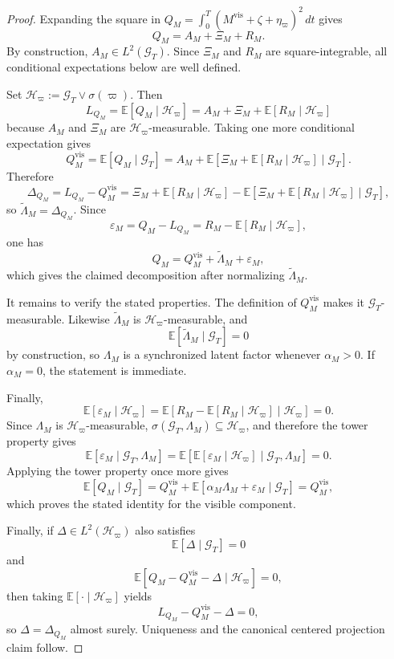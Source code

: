 \documentclass[11pt,a4paper]{amsart}
\theoremstyle{plain}
\theoremstyle{definition}
\theoremstyle{remark}
\newcommand{\EE}{\mathbb{E}}
\newcommand{\dd}{\,d}
\newcommand{\cH}{\mathcal{H}}
\newcommand{\cG}{\mathcal{G}}
\begin{document}
\begin{proof}
Expanding the square in \(Q_M=\int_0^T (M^{\mathrm{vis}}+\zeta+\eta_\varpi)^2\dd t\) gives
\[
        Q_M=A_M+\Xi_M+R_M.
\]
By construction, \(A_M\in L^2(\cG_T)\).  Since \(\Xi_M\) and \(R_M\) are square-integrable, all
conditional expectations below are well defined.

Set \(\cH_\varpi:=\cG_T\vee\sigma(\varpi)\).  Then
\[
        L_{Q_M}
        =
        \EE[Q_M\mid \cH_\varpi]
        =
        A_M+\Xi_M+\EE[R_M\mid \cH_\varpi]
\]
because \(A_M\) and \(\Xi_M\) are \(\cH_\varpi\)-measurable.  Taking one more conditional
expectation gives
\[
        Q_M^{\mathrm{vis}}
        =
        \EE[Q_M\mid \cG_T]
        =
        A_M+\EE[\Xi_M+\EE[R_M\mid \cH_\varpi]\mid \cG_T].
\]
Therefore
\[
        \Delta_{Q_M}
        =
        L_{Q_M}-Q_M^{\mathrm{vis}}
        =
        \Xi_M+\EE[R_M\mid \cH_\varpi]
        -
        \EE[\Xi_M+\EE[R_M\mid \cH_\varpi]\mid \cG_T],
\]
so \(\widetilde\Lambda_M=\Delta_{Q_M}\).  Since
\[
        \varepsilon_M=Q_M-L_{Q_M}=R_M-\EE[R_M\mid \cH_\varpi],
\]
one has
\[
        Q_M=Q_M^{\mathrm{vis}}+\widetilde\Lambda_M+\varepsilon_M,
\]
which gives the claimed decomposition after normalizing \(\widetilde\Lambda_M\).

It remains to verify the stated properties.  The definition of \(Q_M^{\mathrm{vis}}\) makes it
\(\cG_T\)-measurable.  Likewise \(\widetilde\Lambda_M\) is \(\cH_\varpi\)-measurable, and
\[
        \EE[\widetilde\Lambda_M\mid \cG_T]=0
\]
by construction, so \(\Lambda_M\) is a synchronized latent factor whenever \(\alpha_M>0\).  If
\(\alpha_M=0\), the statement is immediate.

Finally,
\[
        \EE[\varepsilon_M\mid \cH_\varpi]
        =
        \EE[R_M-\EE[R_M\mid \cH_\varpi]\mid \cH_\varpi]
        =
        0.
\]
Since \(\Lambda_M\) is \(\cH_\varpi\)-measurable, \(\sigma(\cG_T,\Lambda_M)\subseteq \cH_\varpi\),
and therefore the tower property gives
\[
        \EE[\varepsilon_M\mid \cG_T,\Lambda_M]
        =
        \EE\!\left[\EE[\varepsilon_M\mid \cH_\varpi]\mid \cG_T,\Lambda_M\right]
        =
        0.
\]
Applying the tower property once more gives
\[
        \EE[Q_M\mid \cG_T]
        =
        Q_M^{\mathrm{vis}}
        +
        \EE[\alpha_M\Lambda_M+\varepsilon_M\mid \cG_T]
        =
        Q_M^{\mathrm{vis}},
\]
which proves the stated identity for the visible component.

Finally, if \(\Delta\in L^2(\cH_\varpi)\) also satisfies
\[
        \EE[\Delta\mid \cG_T]=0
\]
and
\[
        \EE[Q_M-Q_M^{\mathrm{vis}}-\Delta\mid \cH_\varpi]=0,
\]
then taking \(\EE[\cdot\mid \cH_\varpi]\) yields
\[
        L_{Q_M}-Q_M^{\mathrm{vis}}-\Delta=0,
\]
so \(\Delta=\Delta_{Q_M}\) almost surely.  Uniqueness and the canonical centered projection
claim follow.
\end{proof}
\end{document}

